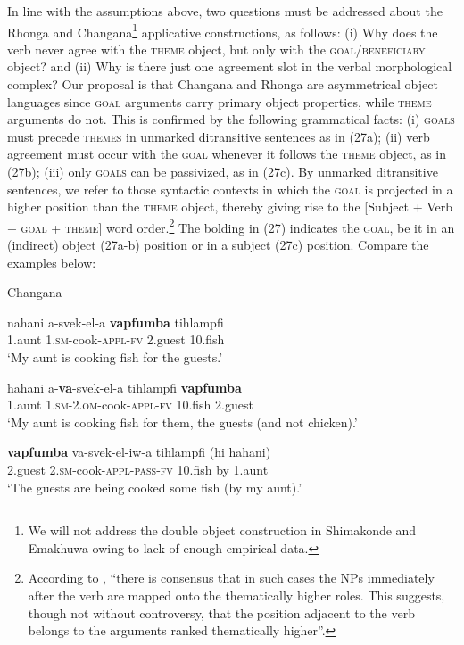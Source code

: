 \documentclass[output=paper]{langsci/langscibook}
\begin{document}
In line with the assumptions above, {two questions must be addressed about the Rhonga and Changana}\footnote{ {We will not address the double object construction in Shimakonde and Emakhuwa owing to lack of enough empirical data. }} {applicative constructions, as follows: (i) Why does the verb never agree with the }{\textsc{theme}} {object, but only with the }{\textsc{goal}}{/}{\textsc{beneficiary}} {object? and (ii) Why is there just one agreement slot in the verbal morphological complex? }Our proposal is that Changana and Rhonga are asymmetrical object languages since \textsc{goal} arguments carry primary object properties, while \textsc{theme} arguments do not. This is confirmed by the following grammatical facts: (i) \textsc{goals} must precede \textsc{themes} in unmarked ditransitive sentences as in (27a); (ii) verb agreement must occur with the \textsc{goal} whenever it follows the \textsc{theme} object, as in (27b); (iii) only \textsc{goals} can be passivized, as in (27c). By unmarked ditransitive sentences, we refer to those syntactic contexts in which the \textsc{goal} is projected in a higher position than the \textsc{theme} object, thereby giving rise to the [Subject + Verb + \textsc{goal} + \textsc{theme}] word order.\footnote{ {According to \citet[111]{Chimbutane2002}, “there is consensus that in such cases the NPs immediately after the verb are mapped onto the thematically higher roles. This suggests, though not without controversy, that the position adjacent to the verb belongs to the arguments ranked thematically higher”.}} The bolding in (27) indicates the \textsc{goal}, be it in an (indirect) object (27a-b) position or in a subject (27c) position. Compare the examples below:

{Changana}

\ea
\gll nahani       a-svek-el-a                  \textbf{vapfumba}       tihlampfi\\
     1.aunt        1.\textsc{sm}{}-cook-\textsc{appl-fv}     2.guest            10.fish\\
\glt ‘My aunt is cooking fish for the guests.’
\z

\ea
\gll hahani       a-\textbf{va}{}-svek-el-a                       tihlampfi         \textbf{vapfumba}\\
     1.aunt        \textsc{1.sm-2.om}{}-cook-\textsc{appl}{}-\textsc{fv}     10.fish             2.guest\\
\glt ‘My aunt is cooking fish for them, the guests (and not chicken).’
\z

\ea
\gll \textbf{vapfumba}     va-svek-el-iw-a                       tihlampfi         (hi    hahani)\\
     2.guest          2.\textsc{sm-}cook-\textsc{appl-pass}{}-\textsc{fv}       10.fish              by    1.aunt\\
\glt ‘The guests are being cooked some fish (by my aunt).’
\z
\end{document}
